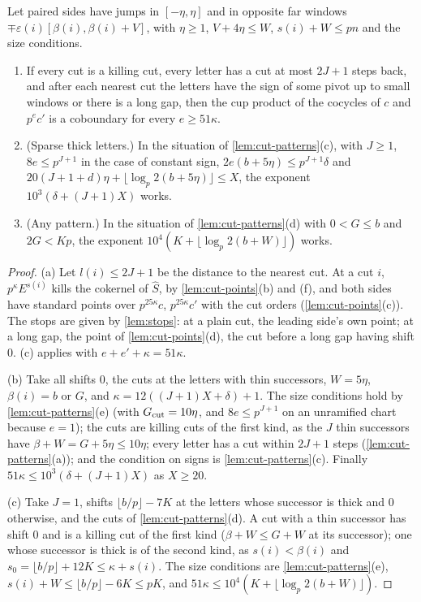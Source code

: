 \begin{lemma}\label{lem:cut-scheme}
Let paired sides have jumps in $[-\eta,\eta]$ and in opposite far windows $\mp\varepsilon(i)[\beta(i),\beta(i)+V]$, with $\eta\ge1$, $V+4\eta\le W$, $s(i)+W\le pn$ and the size conditions.
\begin{enumerate}[label=\textup{(\alph*)}]
\item If every cut is a killing cut, every letter has a cut at most $2J+1$ steps back, and after each nearest cut the letters have the sign of some pivot up to small windows or there is a long gap, then the cup product of the cocycles of $c$ and $p^ec'$ is a coboundary for every $e\ge51\kappa$.
\item (Sparse thick letters.) In the situation of \cref{lem:cut-patterns}(c), with $J\ge1$, $8e\le p^{J+1}$ in the case of constant sign, $2e(b+5\eta)\le p^{J+1}\delta$ and $20(J+1+d)\eta+\lfloor\log_p2(b+5\eta)\rfloor\le X$, the exponent $10^3(\delta+(J+1)X)$ works.
\item (Any pattern.) In the situation of \cref{lem:cut-patterns}(d) with $0<G\le b$ and $2G<Kp$, the exponent $10^4(K+\lfloor\log_p2(b+W)\rfloor)$ works.
\end{enumerate}
\end{lemma}

\begin{proof}
(a) Let $l(i)\le2J+1$ be the distance to the nearest cut. At a cut $i$, $p^\kappa E^{s(i)}$ kills the cokernel of $\hat S$, by \cref{lem:cut-points}(b) and (f), and both sides have standard points over $p^{25\kappa}c$, $p^{25\kappa}c'$ with the cut orders (\cref{lem:cut-points}(c)). The stops are given by \cref{lem:stops}: at a
plain cut, the leading side's own point; at a long gap, the point of \cref{lem:cut-points}(d), the cut before a long gap having shift $0$. (c) applies with $e+e'+\kappa=51\kappa$.

(b) Take all shifts $0$, the cuts at the letters with thin successors, $W=5\eta$, $\beta(i)=b$ or $G$, and $\kappa=12((J+1)X+\delta)+1$. The size conditions hold by \cref{lem:cut-patterns}(e) (with $G_{\rm cut}=10\eta$, and $8e\le p^{J+1}$ on an unramified chart because $e=1$); the cuts are killing cuts of the first kind, as the
$J$ thin successors have $\beta+W=G+5\eta\le10\eta$; every letter has a cut within $2J+1$ steps (\cref{lem:cut-patterns}(a)); and the condition on signs is \cref{lem:cut-patterns}(c). Finally $51\kappa\le10^3(\delta+(J+1)X)$ as $X\ge20$.

(c) Take $J=1$, shifts $\lfloor b/p\rfloor-7K$ at the letters whose successor is thick and $0$ otherwise, and the cuts of \cref{lem:cut-patterns}(d). A cut with a thin successor has shift $0$ and is a killing cut of the first kind ($\beta+W\le G+W$ at its successor); one whose successor is thick is of the second kind, as
$s(i)<\beta(i)$ and $s_0=\lfloor b/p\rfloor+12K\le\kappa+s(i)$. The size conditions are \cref{lem:cut-patterns}(e), $s(i)+W\le\lfloor b/p\rfloor-6K\le pK$, and $51\kappa\le10^4(K+\lfloor\log_p2(b+W)\rfloor)$.
\end{proof}


